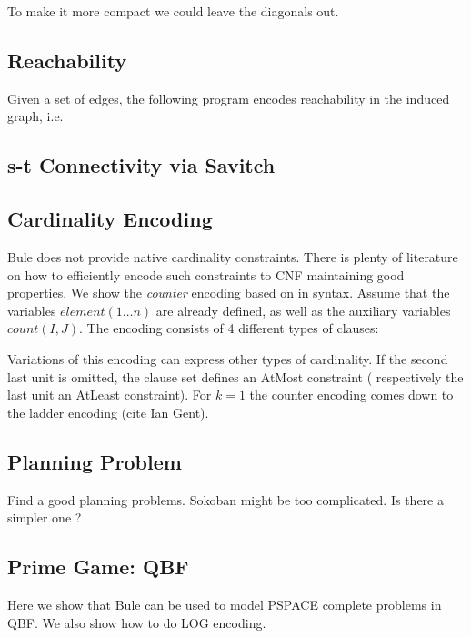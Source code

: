 \documentclass[runningheads]{llncs}
\begin{document}


To make it more compact we could leave the diagonals out. 

\subsection{Reachability}

Given a set of edges, the following program encodes reachability in the induced graph, i.e. 



\subsection{s-t Connectivity via Savitch}

\subsection{Cardinality Encoding}

Bule does not provide native cardinality constraints. 
There is plenty of literature on how to efficiently encode such constraints to CNF maintaining good properties. 
We show the \emph{counter} encoding based on \cite{Sinz05} in \bnice syntax.
Assume that the variables $element(1\ldots n)$ are already defined, as well as 
the auxiliary variables $count(I,J)$. 
The encoding consists of 4 different types of clauses: 



Variations of this encoding can express other types of cardinality.
If the second last unit is omitted, the clause set defines an AtMost constraint ( respectively the last unit an AtLeast constraint). 
For $k=1$ the counter encoding comes down to the ladder encoding (cite Ian Gent). 

\subsection{Planning Problem}

Find a good planning problems. 
Sokoban might be too complicated. 
Is there a simpler one ? 

\subsection{Prime Game: QBF}

Here we show that Bule can be used to model PSPACE complete problems in QBF. 
We also show how to do LOG encoding.  
\end{document}
